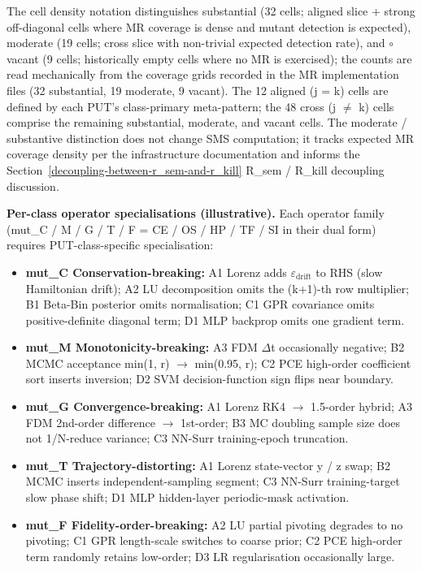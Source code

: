 \documentclass[manuscript,screen,review]{acmart}
\begin{document}
The cell density notation distinguishes \textbullet\textbullet substantial (32 cells;
aligned slice + strong off-diagonal cells where MR coverage is dense and
mutant detection is expected), \textbullet moderate (19 cells; cross slice with
non-trivial expected detection rate), and $\circ$ vacant (9 cells;
historically empty cells where no MR is exercised); the counts are
read mechanically from the coverage grids recorded in the MR
implementation files (32 substantial, 19 moderate, 9 vacant). The 12
aligned (j = k) cells are defined by each PUT's class-primary
meta-pattern; the 48 cross
(j $\neq$ k) cells comprise the remaining substantial, moderate, and
vacant cells. The \textbullet moderate / \textbullet\textbullet substantive
distinction does not change SMS computation; it tracks expected MR
coverage density per the infrastructure documentation and informs the Section~\ref{decoupling-between-r_sem-and-r_kill} R\_sem /
R\_kill decoupling discussion.

\textbf{Per-class operator specialisations (illustrative).} Each
operator family (mut\_C / M / G / T / F = CE / OS / HP / TF / SI in their
dual form) requires PUT-class-specific specialisation:

\begin{itemize}

\item
  \textbf{mut\_C Conservation-breaking:} A1 Lorenz adds $\varepsilon_{\mathrm{drift}}$ to RHS
  (slow Hamiltonian drift); A2 LU decomposition omits the (k+1)-th row
  multiplier; B1 Beta-Bin posterior omits normalisation; C1 GPR
  covariance omits positive-definite diagonal term; D1 MLP backprop
  omits one gradient term.
\item
  \textbf{mut\_M Monotonicity-breaking:} A3 FDM $\Delta$t occasionally
  negative; B2 MCMC acceptance min(1, r) $\to$ min(0.95, r); C2 PCE
  high-order coefficient sort inserts inversion; D2 SVM
  decision-function sign flips near boundary.
\item
  \textbf{mut\_G Convergence-breaking:} A1 Lorenz RK4 $\to$ 1.5-order
  hybrid; A3 FDM 2nd-order difference $\to$ 1st-order; B3 MC doubling sample
  size does not 1/N-reduce variance; C3 NN-Surr training-epoch
  truncation.
\item
  \textbf{mut\_T Trajectory-distorting:} A1 Lorenz state-vector y / z
  swap; B2 MCMC inserts independent-sampling segment; C3 NN-Surr
  training-target slow phase shift; D1 MLP hidden-layer periodic-mask
  activation.
\item
  \textbf{mut\_F Fidelity-order-breaking:} A2 LU partial pivoting
  degrades to no pivoting; C1 GPR length-scale switches to coarse prior;
  C2 PCE high-order term randomly retains low-order; D3 LR
  regularisation occasionally large.
\end{itemize}
\end{document}

